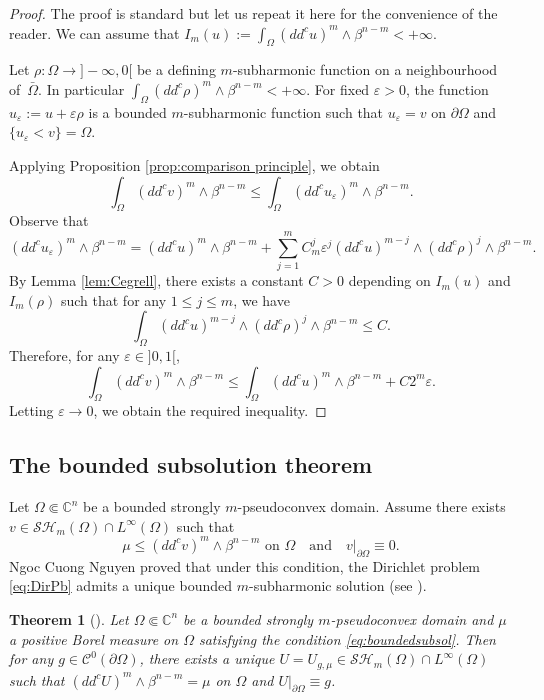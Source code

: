 \documentclass[JEP,XML,SOM,Unicode]{cedram}
\let\epsilon\varepsilon
\newtheorem{theorem}{Theorem}[section]
\theoremstyle{definition}
\renewcommand{\C}{\mathbb{C}}
\newcommand{\Cc}{\mathcal{C}}
\begin{document}
\begin{proof} The proof is standard but let us repeat it here for the convenience of the reader.
We can assume that $I_m (u):= \int_{\Omega}(dd^c u)^m\wedge\beta^{n-m} < + \infty$.

Let $\rho: \Omega \to{} ]- \infty,0[$ be a defining $m$-subharmonic function on a neighbourhood of~$\bar \Omega$. In particular $\int_{\Omega}(dd^c \rho)^m\wedge\beta^{n-m} < + \infty$.
For fixed $\varepsilon > 0$, the function $u_\varepsilon:= u + \varepsilon \rho$ is a bounded $m$-subharmonic function such that $u_\varepsilon = v$ on $\partial \Omega$ and $\{u_\varepsilon < v\} = \Omega$.

Applying Proposition \ref{prop:comparison principle}, we obtain
\[
\int_{\Omega}(dd^c v)^m\wedge\beta^{n-m} \leq \int_{\Omega}(dd^c u_\varepsilon)^m\wedge\beta^{n-m}.
\]
Observe that
\[
(dd^c u_\varepsilon)^m\wedge\beta^{n-m} = (dd^c u)^m\wedge\beta^{n-m} + \sum_{j = 1}^m C_m^j \varepsilon^j (dd^c u)^{m - j} \wedge (dd^c \rho)^j \wedge \beta^{n -m}.
\]
By Lemma \ref{lem:Cegrell}, there exists a constant $C > 0 $ depending on $I_m (u)$ and $I_m (\rho)$ such that for any $1 \leq j \leq m$, we have
\[
\int_\Omega (dd^c u)^{m - j} \wedge (dd^c \rho)^j \wedge \beta^{n -m} \leq C.
\]
Therefore, for any $\epsilon\in{}]0,1[$,
\[
\int_{\Omega}(dd^c v)^m\wedge\beta^{n-m} \leq \int_{\Omega}(dd^c u)^m\wedge\beta^{n-m} + C 2^m \varepsilon.
\]
Letting $\varepsilon \to 0$, we obtain the required inequality.
\end{proof}

\subsection{The bounded subsolution theorem}

Let $\Omega \Subset \C^n$ be a bounded strongly $m$\nobreakdash-pseudoconvex domain. Assume there exists $v \in \mathcal{SH}_m (\Omega)\cap L^{\infty} (\Omega)$ such that
\begin{equation} \label{eq:boundedsubsol}
\mu \leq (dd^c v)^m \wedge \beta^{n -m} \text{ on } \Omega \quad\text{and}\quad v|_{\partial \Omega} \equiv 0.
\end{equation}
Ngoc Cuong Nguyen proved that under this condition, the Dirichlet problem \eqref{eq:DirPb} admits a unique bounded $m$-subharmonic solution (see \cite{N13}).

\begin{theorem}[\cite{N13}] \label{thm:boundedsubsolution}Let $\Omega \Subset \C^n$ be a bounded strongly $m$-pseudoconvex domain and $\mu$ a positive Borel measure on $\Omega$ satisfying the condition \eqref{eq:boundedsubsol}. Then for any $g \in \Cc^0 (\partial \Omega)$, there exists a unique $U = U_{g,\mu} \in \mathcal{SH}_m (\Omega)\cap L^{\infty} (\Omega)$ such that $(dd^c U)^m \wedge \beta^{n -m} = \mu$ on $\Omega$ and $U|_{\partial \Omega} \equiv g$.
\end{theorem}
\end{document}
